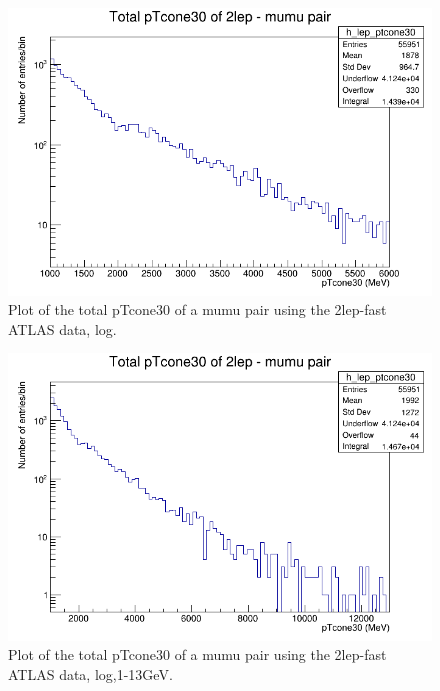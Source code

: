 

\begin{figure}[h!]
    \centering
    \includegraphics[width=0.85\linewidth]{plots/16-02-2021/2lep-fast_mumu_ptcone30(total)_log-entries_1-6GeV_16-02-2021_11-39}
    \caption{Plot of the total pTcone30 of a mumu pair using the 2lep-fast ATLAS data, log. }\label{fig:2lep-fast_mumu_ptcone30(total)_log-entries_1-6GeV_16-02-2021_11-39}
\end{figure}




\begin{figure}[h!]
    \centering
    \includegraphics[width=0.85\linewidth]{plots/16-02-2021/2lep-fast_mumu-pair_ptcone30(total)_log-entries_1-13GeV_16-02-2021_11-45}
    \caption{Plot of the total pTcone30 of a mumu pair using the 2lep-fast ATLAS data, log,1-13GeV. }\label{fig:2lep-fast_mumu-pair_ptcone30(total)_log-entries_1-13GeV_16-02-2021_11-45}
\end{figure}

